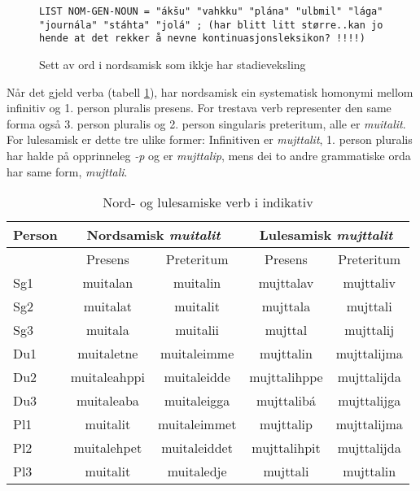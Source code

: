 \documentclass[a4paper,nynorsk]{article}
\begin{document}
\begin{figure}[htbp]
\begin{center}
\begin{verbatim}
LIST NOM-GEN-NOUN = "ákšu" "vahkku" "plána" "ulbmil" "lága" "journála" "stáhta" "jolá" ; (har blitt litt større..kan jo hende at det rekker å nevne kontinuasjonsleksikon? !!!!)
\end{verbatim}
\caption{Sett av ord i nordsamisk som ikkje har stadieveksling}
\label{nomgenlist}
\end{center}
\end{figure}

Når det gjeld verba (tabell \ref{verb}), har nordsamisk ein systematisk homonymi mellom infinitiv og 1. person pluralis presens. For trestava verb representer den same forma også 3. person pluralis og 2. person singularis preteritum, alle er \emph{muitalit}. For lulesamisk er dette tre ulike former: Infinitiven er \emph{mujttalit}, 1. person pluralis har halde på opprinneleg \emph{-p} og er \emph{mujttalip}, mens dei to andre grammatiske orda har same form, \emph{mujttali}.%

\begin{table}[htdp]
\caption{Nord- og lulesamiske verb i indikativ}
\begin{center}
\begin{tabular}{|l|c|c||c|c|}
\hline
Person & \multicolumn{2}{|c||}{Nordsamisk \textit{muitalit}} & \multicolumn{2}{|c|}{Lulesamisk \textit{mujttalit}} \\
\hline
 & Presens & Preteritum & Presens & Preteritum \\
\hline \hline 
Sg1 & muitalan & muitalin &  mujttalav & mujttaliv \\
\hline
Sg2 & muitalat & muitalit & mujttala & mujttali \\
\hline
Sg3 & muitala & muitalii & mujttal & mujttalij \\
\hline
\hline
Du1  & muitaletne & muitaleimme & mujttalin & mujttalijma \\
\hline
Du2 & muitaleahppi & muitaleidde & mujttalihppe & mujttalijda \\
\hline
Du3 & muitaleaba & muitaleigga & mujttalibá & mujttalijga \\
\hline
\hline
Pl1  & muitalit & muitaleimmet & mujttalip & mujttalijma \\
\hline
Pl2 & muitalehpet & muitaleiddet & mujttalihpit & mujttalijda  \\
\hline
Pl3 & muitalit & muitaledje & mujttali & mujttalin \\
\hline
\hline
\end{tabular}
\end{center}
\label{verb}
\end{table}%
\end{document}
